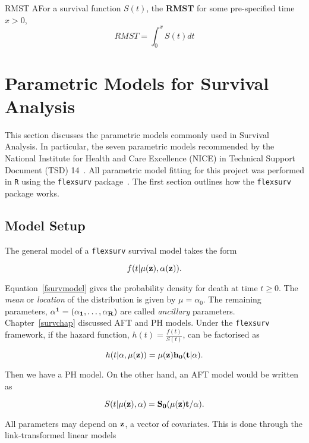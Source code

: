 \begin{definition}{RMST}
    AFor a survival function $S(t)$, the \textbf{RMST} for some pre-specified time $x > 0$,
    \[
        RMST = \int_{0}^{x} S(t)dt
    \] 
\end{definition}

\section{Parametric Models for Survival Analysis}
This section discusses the parametric models commonly used in Survival Analysis. In particular, the seven parametric models recommended by the National Institute for Health and Care Excellence (NICE) in Technical Support Document (TSD) 14~\cite{tsd14}. All parametric model fitting for this project was performed in \verb|R| using the \verb|flexsurv| package~\cite{flexsurv}. The first section outlines how the \verb|flexsurv| package works.

\subsection{Model Setup}
The general model of a \verb|flexsurv| survival model takes the form 

\begin{equation}
    \label{fsurvmodel}
    f(t|\mu(\bf{z}), \bf{\alpha}(\bf{z})).
\end{equation}

Equation~\ref{fsurvmodel} gives the probability density for death at time $t \geq 0$. The \textit{mean} or \textit{location} of the distribution is given by $\mu = \alpha_0$. The remaining parameters, $\bf{\alpha^1} = (\alpha_1, \ldots, \alpha_R)$ are called \textit{ancillary} parameters. \\

Chapter~\ref{survchap} discussed AFT and PH models. Under the \verb|flexsurv| framework, if the hazard function, $h(t) = \frac{f(t)}{S(t)}$, can be factorised as 

\[
    h(t|\bf{\alpha}, \mu(\bf{z})) = \mu(\bf{z})h_0(t|\bf{\alpha}). 
\] 

Then we have a PH model. On the other hand, an AFT model would be written as

\[
    S(t|\mu(\bf{z}), \bf{\alpha}) = S_0(\mu(\bf{z})t/\bf{\alpha}).  
\]

All parameters may depend on $\bf{z}$, a vector of covariates. This is done through the link-transformed linear models

